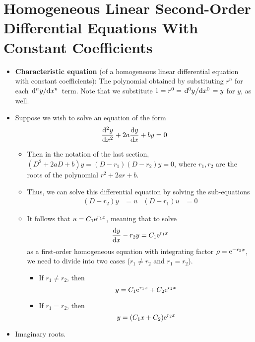 \documentclass[../main.tex]{subfiles}
\begin{document}
\section{Homogeneous Linear Second-Order Differential Equations With Constant Coefficients}
\begin{itemize}
    \item \textbf{Characteristic equation} (of a homogeneous linear differential equation with constant coefficients): The polynomial obtained by substituting $r^n$ for each $\dv*[n]{y}{x}$ term. Note that we substitute $1=r^0=\dv*[0]{y}{x}=y$ for $y$, as well.
    \item Suppose we wish to solve an equation of the form
    \begin{equation*}
        \dv[2]{y}{x}+2a\dv{y}{x}+by = 0
    \end{equation*}
    \begin{itemize}
        \item Then in the notation of the last section, $(D^2+2aD+b)y=(D-r_1)(D-r_2)y=0$, where $r_1,r_2$ are the roots of the polynomial $r^2+2ar+b$.
        \item Thus, we can solve this differential equation by solving the sub-equations
        \begin{align*}
            (D-r_2)y &= u&
            (D-r_1)u &= 0
        \end{align*}
        \item It follows that $u=C_1\e[r_1x]$, meaning that to solve
        \begin{equation*}
            \dv{y}{x}-r_2y = C_1\e[r_1x]
        \end{equation*}
        as a first-order homogeneous equation with integrating factor $\rho=\e[-r_2x]$, we need to divide into two cases ($r_1\neq r_2$ and $r_1=r_2$).
        \begin{itemize}
            \item If $r_1\neq r_2$, then
            \begin{equation*}
                y = C_1\e[r_1x]+C_2\e[r_2x]
            \end{equation*}
            \item If $r_1=r_2$, then
            \begin{equation*}
                y = (C_1x+C_2)\e[r_2x]
            \end{equation*}
        \end{itemize}
    \end{itemize}
    \item Imaginary roots.

\end{itemize}
\end{document}
